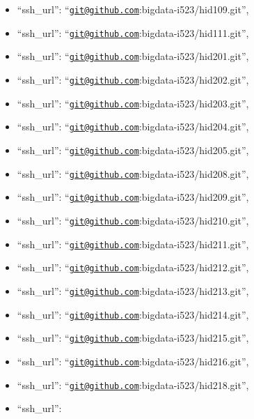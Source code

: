\begin{itemize}
\item
  ``ssh\_url'':
  ``\href{mailto:git@github.com}{\nolinkurl{git@github.com}}:bigdata-i523/hid109.git'',
\item
  ``ssh\_url'':
  ``\href{mailto:git@github.com}{\nolinkurl{git@github.com}}:bigdata-i523/hid111.git'',
\item
  ``ssh\_url'':
  ``\href{mailto:git@github.com}{\nolinkurl{git@github.com}}:bigdata-i523/hid201.git'',
\item
  ``ssh\_url'':
  ``\href{mailto:git@github.com}{\nolinkurl{git@github.com}}:bigdata-i523/hid202.git'',
\item
  ``ssh\_url'':
  ``\href{mailto:git@github.com}{\nolinkurl{git@github.com}}:bigdata-i523/hid203.git'',
\item
  ``ssh\_url'':
  ``\href{mailto:git@github.com}{\nolinkurl{git@github.com}}:bigdata-i523/hid204.git'',
\item
  ``ssh\_url'':
  ``\href{mailto:git@github.com}{\nolinkurl{git@github.com}}:bigdata-i523/hid205.git'',
\item
  ``ssh\_url'':
  ``\href{mailto:git@github.com}{\nolinkurl{git@github.com}}:bigdata-i523/hid208.git'',
\item
  ``ssh\_url'':
  ``\href{mailto:git@github.com}{\nolinkurl{git@github.com}}:bigdata-i523/hid209.git'',
\item
  ``ssh\_url'':
  ``\href{mailto:git@github.com}{\nolinkurl{git@github.com}}:bigdata-i523/hid210.git'',
\item
  ``ssh\_url'':
  ``\href{mailto:git@github.com}{\nolinkurl{git@github.com}}:bigdata-i523/hid211.git'',
\item
  ``ssh\_url'':
  ``\href{mailto:git@github.com}{\nolinkurl{git@github.com}}:bigdata-i523/hid212.git'',
\item
  ``ssh\_url'':
  ``\href{mailto:git@github.com}{\nolinkurl{git@github.com}}:bigdata-i523/hid213.git'',
\item
  ``ssh\_url'':
  ``\href{mailto:git@github.com}{\nolinkurl{git@github.com}}:bigdata-i523/hid214.git'',
\item
  ``ssh\_url'':
  ``\href{mailto:git@github.com}{\nolinkurl{git@github.com}}:bigdata-i523/hid215.git'',
\item
  ``ssh\_url'':
  ``\href{mailto:git@github.com}{\nolinkurl{git@github.com}}:bigdata-i523/hid216.git'',
\item
  ``ssh\_url'':
  ``\href{mailto:git@github.com}{\nolinkurl{git@github.com}}:bigdata-i523/hid218.git'',
\item
  ``ssh\_url'':

\end{itemize}
